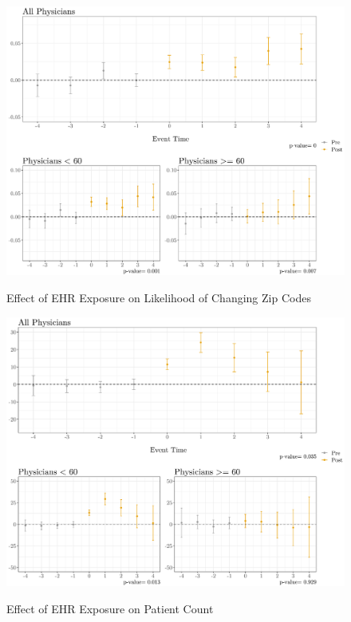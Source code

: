 \documentclass[11pt]{article}
\begin{document}
\begin{figure}[p]
    \centering
    \caption{Effect of EHR Exposure on Likelihood of Changing Zip Codes}
    \includegraphics[scale=.4]{Objects/zip_plot.pdf}
    \label{fig:zip}
\end{figure}

\begin{figure}[p]
    \centering
    \caption{Effect of EHR Exposure on Patient Count}
    \includegraphics[scale=.4]{Objects/patient_plot.pdf}
    \label{fig:patient}
\end{figure}
\end{document}
